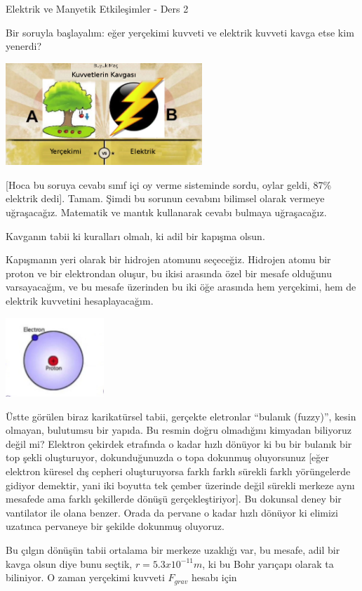 \documentclass[12pt,fleqn]{article}\usepackage{../../common}
\begin{document}
Elektrik ve Manyetik Etkileşimler - Ders 2

Bir soruyla başlayalım: eğer yerçekimi kuvveti ve elektrik kuvveti kavga
etse kim yenerdi?

\includegraphics[width=20em]{02_01.png}

[Hoca bu soruya cevabı sınıf içi oy verme sisteminde sordu, oylar geldi,
87\% elektrik dedi]. Tamam. Şimdi bu sorunun cevabını bilimsel olarak
vermeye uğraşacağız. Matematik ve mantık kullanarak cevabı bulmaya
uğraşacağız.  

Kavganın tabii ki kuralları olmalı, ki adil bir kapışma olsun. 

Kapışmanın yeri olarak bir hidrojen atomunu seçeceğiz. Hidrojen atomu bir
proton ve bir elektrondan oluşur, bu ikisi arasında özel bir mesafe
olduğunu varsayacağım, ve bu mesafe üzerinden bu iki öğe arasında hem
yerçekimi, hem de elektrik kuvvetini hesaplayacağım. 

\includegraphics[width=10em]{02_02.png}

Üstte görülen biraz karikatürsel tabii, gerçekte eletronlar ``bulanık
(fuzzy)'', kesin olmayan, bulutumsu bir yapıda. Bu resmin doğru olmadığını
kimyadan biliyoruz değil mi? Elektron çekirdek etrafında o kadar hızlı
dönüyor ki bu bir bulanık bir top şekli oluşturuyor, dokunduğunuzda o topa
dokunmuş oluyorsunuz [eğer elektron küresel dış cepheri oluşturuyorsa
farklı farklı sürekli farklı yörüngelerde gidiyor demektir, yani iki
boyutta tek çember üzerinde değil sürekli merkeze aynı mesafede ama farklı
şekillerde dönüşü gerçekleştiriyor]. Bu dokunsal deney bir vantilator ile
olana benzer. Orada da pervane o kadar hızlı dönüyor ki elimizi uzatınca
pervaneye bir şekilde dokunmuş oluyoruz.

Bu çılgın dönüşün tabii ortalama bir merkeze uzaklığı var, bu mesafe, adil bir
kavga olsun diye bunu seçtik, $r = 5.3 x 10^{-11}m$, ki bu Bohr yarıçapı olarak
ta biliniyor. O zaman yerçekimi kuvveti $F_{grav}$ hesabı için
\end{document}
